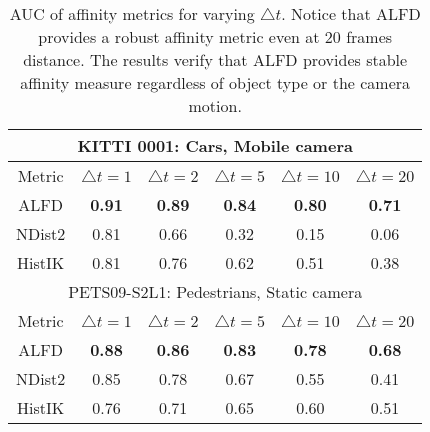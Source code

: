 \documentclass[10pt,twocolumn,letterpaper]{article}
\begin{document}
\begin{table}[t]
\begin{center}
{\scriptsize
\begin{tabular}{| c || c | c | c | c | c |}
\hline
\multicolumn{6}{|c|}{KITTI 0001: Cars, Mobile camera} \\
\hline
Metric & $\triangle t = 1$& $\triangle t = 2$& $\triangle t = 5$& $\triangle t = 10$& $\triangle t = 20$ \\ 
\hline
ALFD & \textbf{0.91} & \textbf{0.89} & \textbf{0.84} & \textbf{0.80} & \textbf{0.71} \\
NDist2 & 0.81 & 0.66 & 0.32 & 0.15 & 0.06 \\
HistIK & 0.81 & 0.76 & 0.62 & 0.51 & 0.38  \\
\hline
\hline
\multicolumn{6}{|c|}{PETS09-S2L1: Pedestrians, Static camera} \\
\hline
Metric & $\triangle t = 1$& $\triangle t = 2$& $\triangle t = 5$& $\triangle t = 10$& $\triangle t = 20$ \\ 
\hline
ALFD & \textbf{0.88} & \textbf{0.86} & \textbf{0.83} & \textbf{0.78} & \textbf{0.68} \\
NDist2 & 0.85 & 0.78 & 0.67 & 0.55 & 0.41\\
HistIK & 0.76 & 0.71 & 0.65 & 0.60 & 0.51  \\
\hline
\end{tabular}
}
\caption{AUC of affinity metrics for varying $\triangle t$. Notice that ALFD provides a robust affinity metric even at $20$ frames distance. The results verify that ALFD provides stable affinity measure regardless of object type or the camera motion.}
\label{tab:alfd}
\end{center}
 \end{table}
\end{document}
